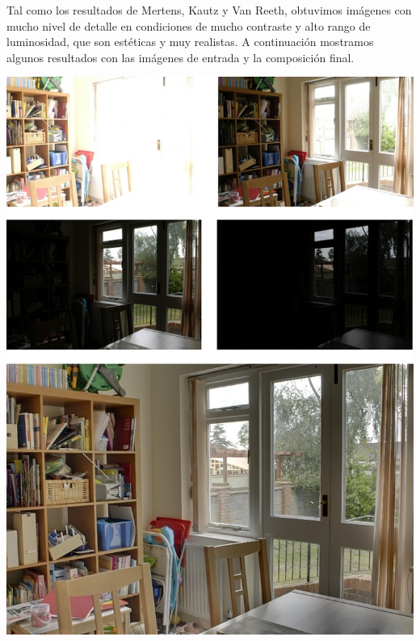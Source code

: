 \documentclass[a4paper,10pt]{article}
\begin{document}
        Tal como los resultados de Mertens, Kautz y Van Reeth, obtuvimos imágenes con mucho nivel de detalle en condiciones de mucho contraste y alto rango de luminosidad, que son estéticas y muy realistas. A continuación mostramos algunos resultados con las imágenes de entrada y la composición final.
        
        \includegraphics[width=\textwidth]{fused1.jpg}
        
\end{document}
